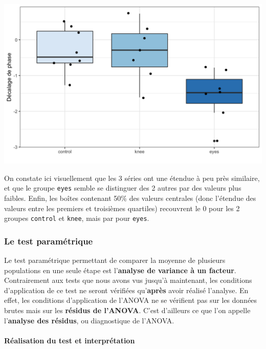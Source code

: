 \documentclass[a4paperpaper,]{article}
\let\oldparagraph\paragraph
\renewcommand{\paragraph}[1]{\oldparagraph{#1}\mbox{}}
\begin{document}
\begin{center}\includegraphics[width=0.9\linewidth]{figure/unnamed-chunk-76-1} \end{center}

On constate ici visuellement que les 3 séries ont une étendue à peu près similaire, et que le groupe \texttt{eyes} semble se distinguer des 2 autres par des valeurs plus faibles. Enfin, les boîtes contenant 50\% des valeurs centrales (donc l'étendue des valeurs entre les premiers et troisièmes quartiles) recouvrent le 0 pour les 2 groupes \texttt{control} et \texttt{knee}, mais par pour \texttt{eyes}.

\hypertarget{le-test-paramuxe9trique-3}{%
\subsubsection{Le test paramétrique}\label{le-test-paramuxe9trique-3}}

Le test paramétrique permettant de comparer la moyenne de plusieurs populations en une seule étape est l'\textbf{analyse de variance à un facteur}. Contrairement aux tests que nous avons vus jusqu'à maintenant, les conditions d'application de ce test ne seront vérifiées qu'\textbf{après} avoir réalisé l'analyse. En effet, les conditions d'application de l'ANOVA ne se vérifient pas sur les données brutes mais sur les \textbf{résidus de l'ANOVA}. C'est d'ailleurs ce que l'on appelle l'\textbf{analyse des résidus}, ou diagnostique de l'ANOVA.

\hypertarget{ruxe9alisation-du-test-et-interpruxe9tation-3}{%
\paragraph{Réalisation du test et interprétation}\label{ruxe9alisation-du-test-et-interpruxe9tation-3}}
\end{document}
